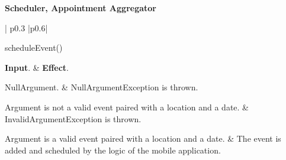 	\textbf{Scheduler, Appointment Aggregator}\\
		\begin{tabular}{| p{} |p{}|}
			\hline
			\hline
			
			 {scheduleEvent() }\\
			\hline
			
			\textbf{Input}.		&		\textbf{Effect}.\\
			\hline
			\hline
			
			NullArgument.		&		NullArgumentException is thrown.\\
			\hline
			
			Argument is not a valid event paired with a location and a date.		&		InvalidArgumentException is thrown.\\
			\hline
		
			Argument is a valid event paired with a location and a date.		&		The event is added and scheduled by the logic of the mobile application.\\
			\hline
			\hline
		\end{tabular}

	\vskip1cm
	\noindent
	

